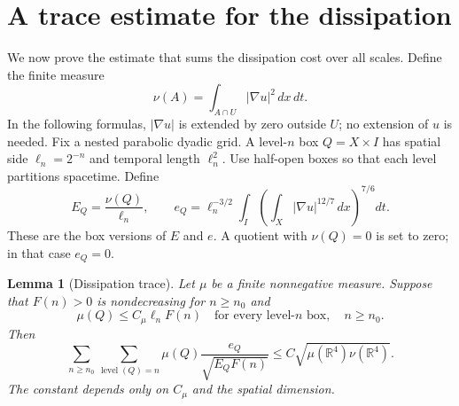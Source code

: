 \documentclass[11pt]{article}
\newtheorem{lemma}[theorem]{Lemma}
\newcommand{\R}{\mathbb R}
\begin{document}
\section{A trace estimate for the dissipation}

We now prove the estimate that sums the dissipation cost over all
scales. Define the finite measure
$$
\nu(A)=\int_{A\cap U}|\nabla u|^2\,dx\,dt.
$$
In the following formulas, \(|\nabla u|\) is extended by zero outside
\(U\); no extension of \(u\) is needed.
Fix a nested parabolic dyadic grid. A level-\(n\) box \(Q=X\times I\)
has spatial side \(\ell_n=2^{-n}\) and temporal length \(\ell_n^2\).
Use half-open boxes so that each level partitions spacetime. Define
$$
E_Q=\frac{\nu(Q)}{\ell_n},
\qquad
e_Q=\ell_n^{-3/2}\int_I
       \left(\int_X|\nabla u|^{12/7}\,dx\right)^{7/6}dt.
$$
These are the box versions of \(E\) and \(e\). A quotient with
\(\nu(Q)=0\) is set to zero; in that case \(e_Q=0\).

\begin{lemma}[Dissipation trace]\label{trace}
Let \(\mu\) be a finite nonnegative measure. Suppose that \(F(n)>0\)
is nondecreasing for \(n\geq n_0\) and
$$
\mu(Q)\leq C_\mu\ell_nF(n)
\quad\text{for every level-}n\text{ box},\quad n\geq n_0.
$$
Then
$$
\sum_{n\geq n_0}\sum_{\operatorname{level}(Q)=n}
 \mu(Q)\frac{e_Q}{\sqrt{E_QF(n)}}
\leq C\sqrt{\mu(\R^4)\nu(\R^4)}.
$$
The constant depends only on \(C_\mu\) and the spatial dimension.
\end{lemma}
\end{document}
